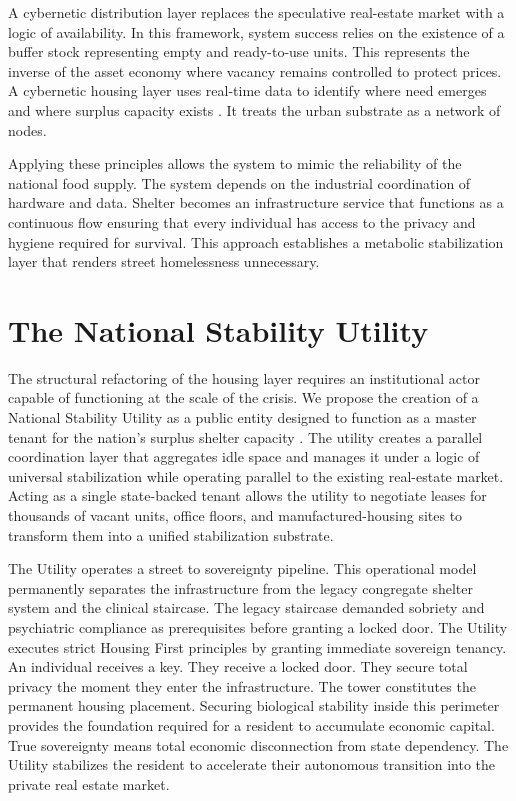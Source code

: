 \documentclass[12pt, letterpaper]{article}
\begin{document}
A cybernetic distribution layer replaces the speculative real-estate market with a logic of availability. In this framework, system success relies on the existence of a buffer stock representing empty and ready-to-use units. This represents the inverse of the asset economy where vacancy remains controlled to protect prices. A cybernetic housing layer uses real-time data to identify where need emerges and where surplus capacity exists \citep{beer_1972, beer_1981, ashby_1956, wiener_1948}. It treats the urban substrate as a network of nodes.

Applying these principles allows the system to mimic the reliability of the national food supply. The system depends on the industrial coordination of hardware and data. Shelter becomes an infrastructure service that functions as a continuous flow ensuring that every individual has access to the privacy and hygiene required for survival. This approach establishes a metabolic stabilization layer that renders street homelessness unnecessary.

\section{The National Stability Utility}

The structural refactoring of the housing layer requires an institutional actor capable of functioning at the scale of the crisis. We propose the creation of a National Stability Utility as a public entity designed to function as a master tenant for the nation's surplus shelter capacity \citep{beer_1972}. The utility creates a parallel coordination layer that aggregates idle space and manages it under a logic of universal stabilization while operating parallel to the existing real-estate market. Acting as a single state-backed tenant allows the utility to negotiate leases for thousands of vacant units, office floors, and manufactured-housing sites to transform them into a unified stabilization substrate.

The Utility operates a street to sovereignty pipeline. This operational model permanently separates the infrastructure from the legacy congregate shelter system and the clinical staircase. The legacy staircase demanded sobriety and psychiatric compliance as prerequisites before granting a locked door. The Utility executes strict Housing First principles by granting immediate sovereign tenancy. An individual receives a key. They receive a locked door. They secure total privacy the moment they enter the infrastructure. The tower constitutes the permanent housing placement. Securing biological stability inside this perimeter provides the foundation required for a resident to accumulate economic capital. True sovereignty means total economic disconnection from state dependency. The Utility stabilizes the resident to accelerate their autonomous transition into the private real estate market.
\end{document}
